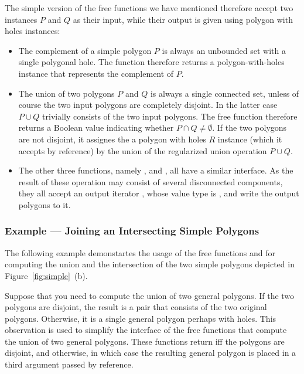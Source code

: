 The simple version of the free functions we have mentioned therefore
accept two  instances $P$ and $Q$ as their input, while
their output is given using polygon with holes instances:
\begin{itemize}
\item The complement of a simple polygon $P$ is always an unbounded set
with a single polygonal hole. The function  therefore
returns a polygon-with-holes instance that represents the complement of $P$.
\item The union of two polygons $P$ and $Q$ is always a single connected
set, unless of course the two input polygons are completely disjoint. In
the latter case $P \cup Q$ trivially consists of the two input polygons.
The free function  therefore returns a Boolean value
indicating whether $P \cap Q \neq \emptyset$. If the two polygons are not
disjoint, it assignes the a polygon with holes $R$ instance (which it
accepts by reference) by the union of the regularized union operation
$P \cup Q$.
\item The other three functions, namely , 
 and , all
have a similar interface. As the result of these operation may consist of
several disconnected components, they all accept an output iterator ,
whose value type is , and write the
output polygons to it.
\end{itemize}

\subsubsection{Example --- Joining an Intersecting Simple Polygons}
\label{bops_sssec:ex_simple_bops}

The following example demonstartes the usage of the free functions
 and  for computing the union and the
intersection of the two simple polygons depicted in
Figure~\ref{fig:simple}~(b).


Suppose that you need to compute the union of two general polygons. If the
two polygons are disjoint, the result is a pair that consists of the two 
original polygons. Otherwise, it is a single general polygon perhaps with 
holes. This observation is used to simplify the interface of the free
functions that compute the union of two general polygons. These functions
return  iff the polygons are disjoint, and  otherwise,
in which case the resulting general polygon is placed in a third argument 
passed by reference.

